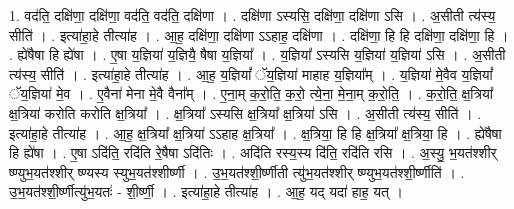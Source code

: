 \documentclass[17pt]{extarticle}
\begin{document}
1. वद॑ति॒ दक्षि॑णा॒ दक्षि॑णा॒ वद॑ति॒ वद॑ति॒ दक्षि॑णा । . दक्षि॑णा ऽस्यसि॒ दक्षि॑णा॒ दक्षि॑णा ऽसि । . अ॒सीती त्य॑स्य॒ सीति॑ । . इत्या॑हा॒हे तीत्या॑ह । . आ॒ह॒ दक्षि॑णा॒ दक्षि॑णा ऽऽहाह॒ दक्षि॑णा । . दक्षि॑णा॒ हि हि दक्षि॑णा॒ दक्षि॑णा॒ हि । . ह्ये॑षैषा हि ह्ये॑षा । . ए॒षा य॒ज्ञिया॑ य॒ज्ञियै॒ षैषा य॒ज्ञिया᳚ । . य॒ज्ञिया᳚ ऽस्यसि य॒ज्ञिया॑ य॒ज्ञिया॑ ऽसि । . अ॒सीती त्य॑स्य॒ सीति॑ । . इत्या॑हा॒हे तीत्या॑ह । . आ॒ह॒ य॒ज्ञियां᳚ ॅय॒ज्ञिया॑ माहाह य॒ज्ञिया᳚म् । . य॒ज्ञिया॑ मे॒वैव य॒ज्ञियां᳚ ॅय॒ज्ञिया॑ मे॒व । . ए॒वैना॑ मेना मे॒वै वैना᳚म् । . ए॒ना॒म् क॒रो॒ति॒ क॒रो॒ त्ये॒ना॒ मे॒ना॒म् क॒रो॒ति॒ । . क॒रो॒ति॒ क्ष॒त्रिया᳚ क्ष॒त्रिया॑ करोति करोति क्ष॒त्रिया᳚ । . क्ष॒त्रिया᳚ ऽस्यसि क्ष॒त्रिया᳚ क्ष॒त्रिया॑ ऽसि । . अ॒सीती त्य॑स्य॒ सीति॑ । . इत्या॑हा॒हे तीत्या॑ह । . आ॒ह॒ क्ष॒त्रिया᳚ क्ष॒त्रिया॑ ऽऽहाह क्ष॒त्रिया᳚ । . क्ष॒त्रिया॒ हि हि क्ष॒त्रिया᳚ क्ष॒त्रिया॒ हि । . ह्ये॑षैषा हि ह्ये॑षा । . ए॒षा ऽदि॑ति॒ रदि॑ति रे॒षैषा ऽदि॑तिः । . अदि॑ति रस्य॒स्य दि॑ति॒ रदि॑ति रसि । . अ॒स्यु॒ भ॒यत॑श्शीर् ष्ण्युभ॒यत॑श्शीर् ष्ण्यस्य स्युभ॒यत॑श्शीर्ष्णी । . उ॒भ॒यत॑श्शी॒र्ष्णीती त्यु॑भ॒यत॑श्शीर् ष्ण्युभ॒यत॑श्शी॒र्ष्णीति॑ । . उ॒भ॒यत॑श्शी॒र्ष्णीत्यु॑भ॒यतः॑ - शी॒र्ष्णी॒ । . इत्या॑हा॒हे तीत्या॑ह । . आ॒ह॒ यद् यदा॑ हाह॒ यत् । \newline
\end{document}
